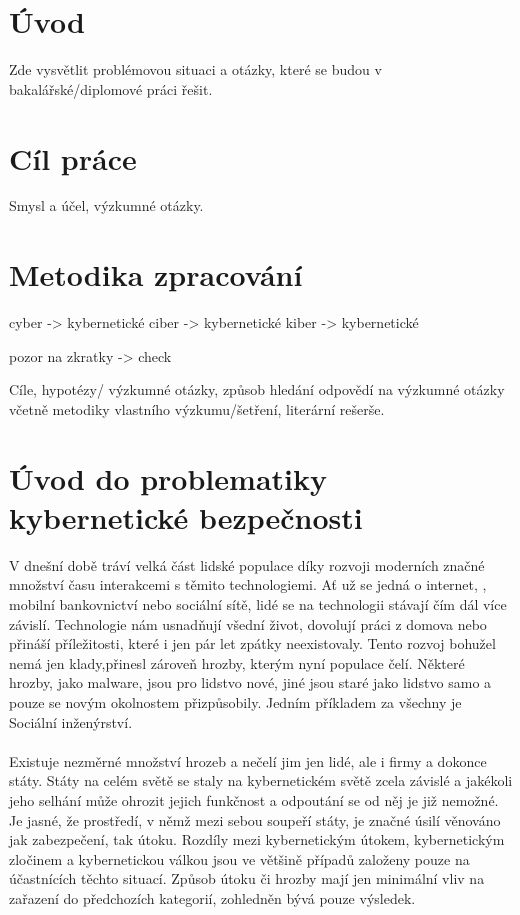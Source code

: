 \section{Úvod}\label{sec:uvod}


Zde vysvětlit problémovou situaci a otázky, které se budou v bakalářské/diplomové práci řešit.

\section{Cíl práce}\label{sec:cil-prace}


Smysl a účel, výzkumné otázky.

\section{Metodika zpracování}\label{sec:metodika-zpracovani}


cyber -> kybernetické
ciber -> kybernetické
kiber -> kybernetické

pozor na zkratky -> check



Cíle, hypotézy/ výzkumné otázky, způsob hledání odpovědí na výzkumné otázky včetně metodiky vlastního výzkumu/šetření, literární rešerše.

\section{Úvod do problematiky kybernetické bezpečnosti}\label{sec:uvod-do-problematiky-kyberneticke-bezpecnosti}
V dnešní době tráví velká část lidské populace díky rozvoji moderních značné množství času interakcemi s těmito technologiemi.
Ať už se jedná o internet, , mobilní bankovnictví nebo sociální sítě, lidé se na technologii stávají čím dál více závislí.
Technologie nám usnadňují všední život, dovolují práci z domova nebo přináší příležitosti, které i jen pár let zpátky neexistovaly.
Tento rozvoj bohužel nemá jen klady,přinesl zároveň hrozby, kterým nyní populace čelí.
Některé hrozby, jako malware, jsou pro lidstvo nové, jiné jsou staré jako lidstvo samo a pouze se novým okolnostem přizpůsobily.
Jedním příkladem za všechny je Sociální inženýrství.

\paragraph{}
Existuje nezměrné množství hrozeb a nečelí jim jen lidé, ale i firmy a dokonce státy.
Státy na celém světě se staly na kybernetickém světě zcela závislé a jakékoli jeho selhání může ohrozit jejich funkčnost a odpoutání se od něj je již nemožné.\cite{LI20218176}
Je jasné, že prostředí, v němž mezi sebou soupeří státy, je značné úsilí věnováno jak zabezpečení, tak útoku.
Rozdíly mezi kybernetickým útokem, kybernetickým zločinem a kybernetickou válkou jsou ve většině případů založeny pouze na účastnících těchto situací.\cite{LI20218176}
Způsob útoku či hrozby mají jen minimální vliv na zařazení do předchozích kategorií, zohledněn bývá pouze výsledek.

